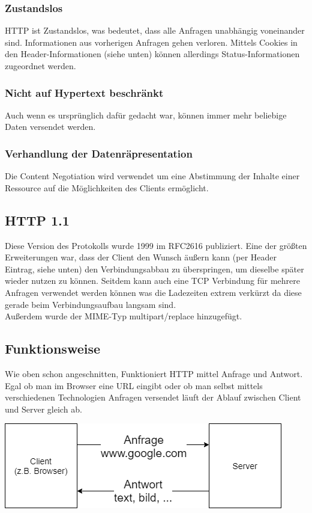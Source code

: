 \documentclass{article}
\begin{document}
\subsubsection{Zustandslos}
HTTP ist Zustandslos, was bedeutet, dass alle Anfragen unabhängig voneinander sind. Informationen aus vorherigen Anfragen gehen verloren. Mittels Cookies in den Header-Informationen (siehe unten) können allerdings Status-Informationen zugeordnet werden. 

\subsubsection{Nicht auf Hypertext beschränkt}
Auch wenn es ursprünglich dafür gedacht war, können immer mehr beliebige Daten versendet werden. 

\subsubsection{Verhandlung der Datenräpresentation}
Die Content Negotiation wird verwendet um eine Abstimmung der Inhalte einer Ressource auf die Möglichkeiten des Clients ermöglicht.

\subsection{HTTP 1.1}
Diese Version des Protokolls wurde 1999 im RFC2616 publiziert. Eine der größten Erweiterungen war, dass der Client den Wunsch äußern kann (per Header Eintrag, siehe unten) den Verbindungsabbau zu überspringen, um dieselbe später wieder nutzen zu können. Seitdem kann auch eine TCP Verbindung für mehrere Anfragen verwendet werden können was die Ladezeiten extrem verkürzt da diese gerade beim Verbindungsaufbau langsam sind. \\
Außerdem wurde der MIME-Typ multipart/replace hinzugefügt.


\subsection{Funktionsweise}
Wie oben schon angeschnitten, Funktioniert HTTP mittel Anfrage und Antwort. Egal ob man im Browser eine URL eingibt oder ob man selbst mittels verschiedenen Technologien Anfragen versendet läuft der Ablauf zwischen Client und Server gleich ab.\\
\begin{center}
 \includegraphics[scale=0.6]{funktionsweise.png}   
\end{center}
\end{document}
